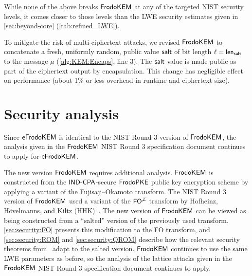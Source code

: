 \documentclass{iacrcc}
\begin{document}

While none of the above breaks $\textsf{\upshape\mdseries FrodoKEM}$ at any of the targeted NIST security levels, it comes closer to those levels than the LWE security estimates given in \autoref{sec:beyond-core} (\autoref{tab:refined_LWE}).

To mitigate the risk of multi-ciphertext attacks, we revised $\textsf{\upshape\mdseries FrodoKEM}$ to concatenate a fresh, uniformly random, public value ${\mathsf{salt}}$ of bit length $\ell={\mathsf{len}_{{\mathsf{salt}}}}$ to the message $\mu$ (\autoref{alg:KEM:Encaps}, line 3).
The ${\mathsf{salt}}$ value is made public as part of the ciphertext output by encapsulation.
This change has negligible effect on performance (about 1\% or less overhead in runtime and ciphertext size).
\color{black}

\section{Security analysis}\label{sec:security}

Since $\textsf{\upshape\mdseries eFrodoKEM}$ is identical to the NIST Round 3 version of $\textsf{\upshape\mdseries FrodoKEM}$, the analysis given in the $\textsf{\upshape\mdseries FrodoKEM}$ NIST Round 3 specification document continues to apply for $\textsf{\upshape\mdseries eFrodoKEM}$.

The new version $\textsf{\upshape\mdseries FrodoKEM}$ requires additional analysis.
$\textsf{\upshape\mdseries FrodoKEM}$ is constructed from the $\textsf{\upshape\mdseries IND-CPA}$-secure $\textsf{\upshape\mdseries FrodoPKE}$ public key encryption scheme by applying a variant of the Fujisaji--Okamoto transform.
The NIST Round 3 version of $\textsf{\upshape\mdseries FrodoKEM}$ used a variant of the $\textsf{\upshape\mdseries FO}^{\not\perp}$ transform by Hofheinz, H{\" o}velmanns, and Kiltz (HHK)~\cite{TCC:HofHovKil17}.
The new version of $\textsf{\upshape\mdseries FrodoKEM}$ can be viewed as being constructed from a ``salted'' version of the previously used transform.
\autoref{sec:security:FO} presents this modification to the FO transform, and \autoref{sec:security:ROM} and \autoref{sec:security:QROM} describe how the relevant security theorems from~\cite{TCC:HofHovKil17,C:JZCWM18} adapt to the salted version.
$\textsf{\upshape\mdseries FrodoKEM}$ continues to use the same LWE parameters as before, so the analysis of the lattice attacks given in the $\textsf{\upshape\mdseries FrodoKEM}$ NIST Round 3 specification document continues to apply.
\end{document}
